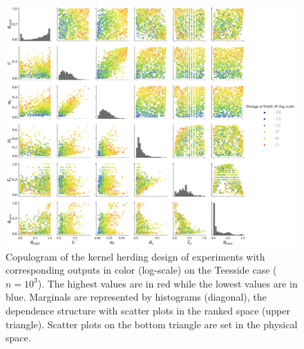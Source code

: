 \begin{figure}[!h]
\begin{center}
    \includegraphics[width=\textwidth]{part2/figures/DCE/teesside/kh_output_pairplot.jpg}
\end{center}
\caption{Copulogram of the kernel herding design of experiments with corresponding outputs in color (log-scale) on the Teesside case ($n = 10^3$). 
The highest values are in red while the lowest values are in blue. 
Marginals are represented by histograms (diagonal), the dependence structure with scatter plots in the ranked space (upper triangle). 
Scatter plots on the bottom triangle are set in the physical space.} \label{fig:pairplot_kh_teesside}
\end{figure}

